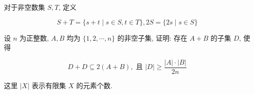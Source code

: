 \documentclass[aspectratio=169]{ctexbeamer}
\begin{document}

\begin{frame}\label{ex:6}
对于非空数集 $S ,  T$, 定义

$$
S+T=\{s+t \mid s \in S, t \in T\}, 2 S=\{2 s \mid s \in S\}
$$

设 $n$ 为正整数, $A ,  B$ 均为 $\{1,2, \cdots, n\}$ 的非空子集, 证明: 存在 $A+B$ 的子集 $D$, 使得

$$
D+D \subseteq 2(A+B), \text { 且 }|D| \geqslant \frac{|A| \cdot|B|}{2 n}
$$

这里 $|X|$ 表示有限集 $X$ 的元素个数.
\end{frame}

\end{document}
